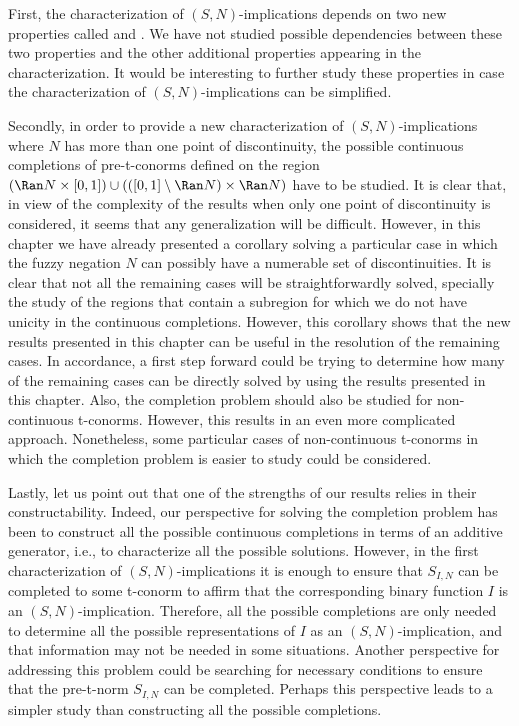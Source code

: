 First, the characterization of $(S,N)$-implications depends on two new properties called \Rone and \Rtwo. We have not studied possible dependencies between these two properties and the other additional properties appearing in the characterization. It would be interesting to further study these properties in case the characterization of $(S,N)$-implications can be simplified. 

Secondly, in order to provide a new characterization of $(S,N)$-implications where $N$ has more than one point of discontinuity, the possible continuous completions of pre-t-conorms defined on the region $(\Ran N \times [0,1]) \cup (([0,1] \setminus \Ran N) \times \Ran N)$ have to be studied. It is clear that, in view of the complexity of the results when only one point of discontinuity is considered, it seems that any generalization will be difficult. However, in this chapter we have already presented a corollary solving a particular case in which the fuzzy negation $N$ can possibly have a numerable set of discontinuities. It is clear that not all the remaining cases will be straightforwardly solved, specially the study of the regions that contain a subregion for which we do not have unicity in the continuous completions. However, this corollary shows that the new results presented in this chapter can be useful in the resolution of the remaining cases. In accordance, a first step forward could be trying to determine how many of the remaining cases can be directly solved by using the results presented in this chapter. Also, the completion problem should also be studied for non-continuous t-conorms. However, this results in an even more complicated approach. Nonetheless, some particular cases of non-continuous t-conorms in which the completion problem is easier to study could be considered.

Lastly, let us point out that one of the strengths of our results relies in their constructability. Indeed, our perspective for solving the completion problem has been to construct all the possible continuous completions in terms of an additive generator, i.e., to characterize all the possible solutions. However, in the first characterization of $(S,N)$-implications it is enough to ensure that $S_{I,N}$ can be completed to some t-conorm to affirm that the corresponding binary function $I$ is an $(S,N)$-implication. Therefore, all the possible completions are only needed to determine all the possible representations of $I$ as an $(S,N)$-implication, and that information may not be needed in some situations. Another perspective for addressing this problem could be searching for necessary conditions to ensure that the pre-t-norm $S_{I,N}$ can be completed. Perhaps this perspective leads to a simpler study than constructing all the possible completions.